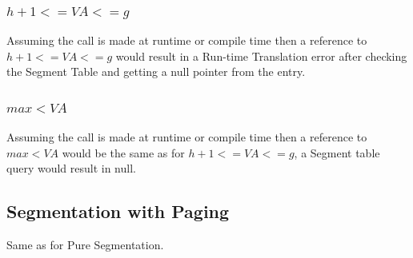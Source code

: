 \documentclass[11pt]{article} %
\begin{document}
\subsubsection*{$h+1 <= VA <= g$}

Assuming the call is made at runtime or compile time  then a reference to $h+1 <= VA <= g$ would result in a Run-time Translation error after checking the Segment Table and getting a null pointer from the entry.


\subsubsection*{$max < VA $}

Assuming the call is made at runtime or compile time then a reference to $max < VA$ would be the same as for $h+1 <= VA <= g$, a Segment table query would result in null.

\subsection*{Segmentation with Paging}

Same as for Pure Segmentation.
\end{document}
